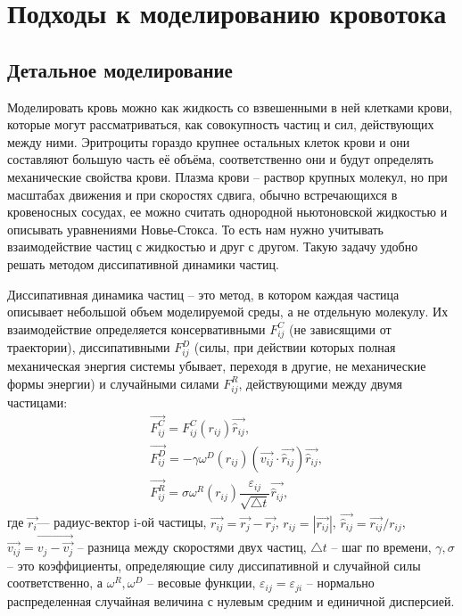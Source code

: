 \section{Подходы к моделированию кровотока}
\subsection{Детальное моделирование}
Моделировать кровь можно как жидкость со взвешенными в ней клетками крови, которые могут рассматриваться, как совокупность частиц и сил,
действующих между ними. Эритроциты гораздо крупнее остальных клеток крови и они составляют большую часть её объёма, соответственно они 
и будут определять механические свойства крови. Плазма крови -- раствор крупных молекул, но при масштабах движения и при скоростях
сдвига, обычно встречающихся в кровеносных сосудах, ее можно считать однородной ньютоновской жидкостью  и описывать уравнениями
Новье-Стокса. То есть нам нужно учитывать взаимодействие частиц с жидкостью и друг с другом. Такую задачу удобно решать методом 
диссипативной динамики частиц.

Диссипативная динамика частиц -- это метод, в котором каждая частица описывает небольшой объем моделируемой среды, 
а не отдельную молекулу. Их взаимодействие определяется консервативными $F^C_{ij}$ (не зависящими от траектории), диссипативными 
$F^D_{ij}$ (силы, при действии которых полная механическая энергия  системы убывает, переходя в другие, не механические формы энергии) 
и случайными силами $F^R_{ij}$, действующими между двумя частицами:
\begin{align*}
  &\vec{F^C_{ij}}=F^C_{ij}(r_{ij})\vec{\hat{r}{_{ij}}},\\[10pt]
  &\vec{F^D_{ij}}=-\gamma \omega^D(r_{ij}) (\vec{v_{ij}} \cdot \vec{\hat{r}{_{ij}}})\vec{\hat{r}{_{ij}}},\\[10pt]
  &\vec{F^R_{ij}}=\sigma \omega^R(r_{ij}) \dfrac{\varepsilon_{ij}}{\sqrt{\bigtriangleup t}} \vec{\hat{r}{_{ij}}},
\end{align*}
где $\vec{r_{i}}$— радиус-вектор i-ой частицы, $\vec{r_{ij}}=\vec{r_{j}} - \vec{r_{j}}$,
$r_{ij}=|\vec{r_{ij}}|$,
$\vec{\hat{r}{_{ij}}}=\vec{r_{ij}}/{r_{ij}}$,
$\vec{v_{ij}}=\vec{v_{j} - \vec{v_{j}}}$ -- разница между скоростями двух частиц, $\bigtriangleup t$ -- шаг по времени, 
$\gamma, \sigma$ -- это  коэффициенты, определяющие силу диссипативной и случайной силы соответственно, а $\omega^R,\omega^D$ -- весовые функции,
${\varepsilon_{ij}={\varepsilon_{ji}}}$ -- нормально распределенная случайная величина с нулевым средним и единичной дисперсией.

